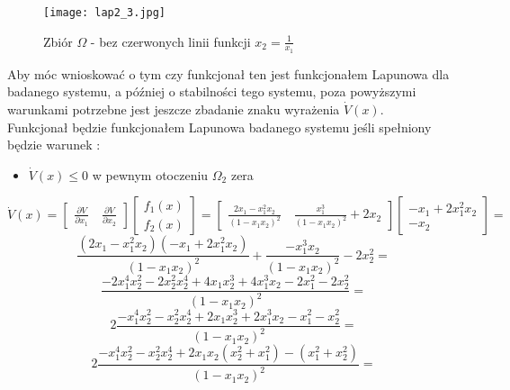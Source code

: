 \documentclass[a4paper,11pt]{article}
\begin{document}
\begin{figure}[H]
\centerline{\texttt{[image: lap2\_3.jpg]}}
\centering
\caption{Zbiór \( \Omega \) - bez czerwonych linii funkcji \(x_{2}=\frac{1}{x_{1}} \) }
\label{fig:lap2_3}
\end{figure}
Aby móc wnioskować o tym czy funkcjonał ten jest funkcjonałem Lapunowa dla badanego systemu, a później o stabilności tego systemu, poza powyższymi warunkami potrzebne jest jeszcze zbadanie znaku wyrażenia \( \dot{V}(x) \). \\ Funkcjonał będzie funkcjonałem Lapunowa badanego systemu jeśli spełniony będzie warunek :
\begin{itemize}
\item \( \dot{V}(x)\leq 0 \) w pewnym otoczeniu \( \Omega_{2}\) zera
\end{itemize} 
\begin{equation*}
\dot{V}(x)=
\begin{bmatrix}
\frac{\partial V}{\partial x_{1}} \quad
\frac{\partial V}{\partial x_{2}} 
\end{bmatrix}
\begin{bmatrix}
f_{1}(x) \\
f_{2}(x)
\end{bmatrix}=
\begin{bmatrix}
\frac{2x_{1}-x_{1}^{2}x_{2}}{(1-x_{1}x_{2})^{2}} \quad
\frac{x_{1}^{3}}{(1-x_{1}x_{2})^{2}}+2x_{2}
\end{bmatrix}
\begin{bmatrix}
-x_{1}+2x_{1}^{2}x_{2} \\ 
-x_{2}
\end{bmatrix}=
\end{equation*}
\begin{equation*}
\frac{(2x_{1}-x_{1}^{2}x_{2})(-x_{1}+2x_{1}^{2}x_{2})}{(1-x_{1}x_{2})^{2}}+\frac{-x_{1}^{3}x_{2}}{(1-x_{1}x_{2})^{2}}-2x_{2}^{2}=
\end{equation*}
\begin{equation*}
\frac{-2x_{1}^{4}x_{2}^{2}-2x_{2}^{2}x_{2}^{4}+4x_{1}x_{2}^{3}+4x_{1}^{3}x_{2}-2x_{1}^{2}-2x_{2}^{2}}{(1-x_{1}x_{2})^{2}}=
\end{equation*}
\begin{equation*}
2\frac{-x_{1}^{4}x_{2}^{2}-x_{2}^{2}x_{2}^{4}+2x_{1}x_{2}^{3}+2x_{1}^{3}x_{2}-x_{1}^{2}-x_{2}^{2}}{(1-x_{1}x_{2})^{2}}=
\end{equation*}
\begin{equation*}
2\frac{ -x_{1}^{4}x_{2}^{2}-x_{2}^{2}x_{2}^{4}  +  2x_{1}x_{2}(x_{2}^{2}+x_{1}^{2}) - (x_{1}^{2}+x_{2}^{2})}{(1-x_{1}x_{2})^{2}}=
\end{equation*}
\end{document}
